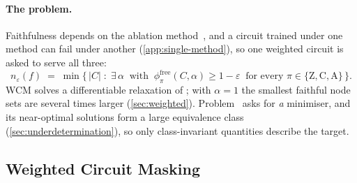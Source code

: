 \documentclass[10pt]{article}
\begin{document}
\paragraph{The problem.}
Faithfulness depends on the ablation method~\citep{miller2024transformer, mueller2024missed}, and a circuit trained under one method can fail under another (\cref{app:single-method}), so one weighted circuit is asked to serve all three:
\begin{equation}\tag{P}\label{eq:p2}
    n_{\varepsilon}(f)
    \;=\;
    \min \bigl\{\, |C| \;:\; \exists\, \alpha \ \text{ with } \ \phi^{\mathrm{free}}_{\pi}(C, \alpha) \geq 1 - \varepsilon \ \text{ for every } \pi \in \{\mathrm{Z}, \mathrm{C}, \mathrm{A}\} \,\bigr\}.
\end{equation}
WCM solves a differentiable relaxation of ; with $\alpha = 1$ the smallest faithful node sets are several times larger (\cref{sec:weighted}).
Problem~ asks for \emph{a} minimiser, and its near-optimal solutions form a large equivalence class (\cref{sec:underdetermination}), so only class-invariant quantities describe the target.

\subsection{Weighted Circuit Masking}
\label{sec:ablmask}
\end{document}
